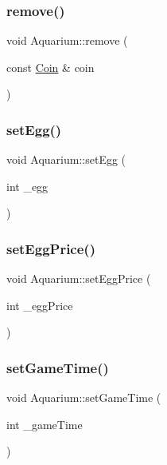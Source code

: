\subsubsection{\texorpdfstring{remove()}{remove()}\hspace{0.1cm}{\footnotesize\ttfamily [5/5]}}
{\footnotesize\ttfamily void Aquarium\+::remove (\begin{DoxyParamCaption}\item[{const \mbox{\hyperlink{class_coin}{Coin}} \&}]{coin }\end{DoxyParamCaption})}

\mbox{\label{class_aquarium_aa9398d7691f5c443459d4b38a9be5483}} 
\subsubsection{\texorpdfstring{set\+Egg()}{setEgg()}}
{\footnotesize\ttfamily void Aquarium\+::set\+Egg (\begin{DoxyParamCaption}\item[{int}]{\+\_\+egg }\end{DoxyParamCaption})}

\mbox{\label{class_aquarium_a08863cdaa6016dccc8e35be9171be652}} 
\subsubsection{\texorpdfstring{set\+Egg\+Price()}{setEggPrice()}}
{\footnotesize\ttfamily void Aquarium\+::set\+Egg\+Price (\begin{DoxyParamCaption}\item[{int}]{\+\_\+egg\+Price }\end{DoxyParamCaption})}

\mbox{\label{class_aquarium_a93d5b161e95bf64fc36642d3ec93ca48}} 
\subsubsection{\texorpdfstring{set\+Game\+Time()}{setGameTime()}}
{\footnotesize\ttfamily void Aquarium\+::set\+Game\+Time (\begin{DoxyParamCaption}\item[{int}]{\+\_\+game\+Time }\end{DoxyParamCaption})}

